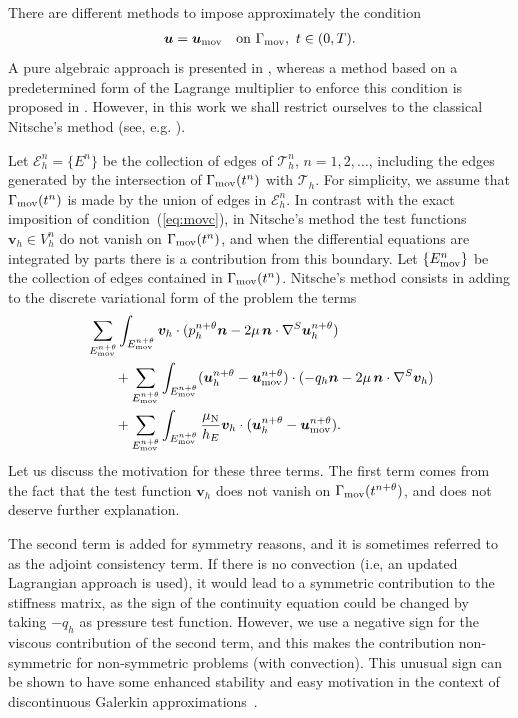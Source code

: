 \documentclass[11pt,a4paper,oneside,reqno]{amsart}
\newcommand{\Eq}[1]{(\ref{eq:#1})}
\def\u{{\bm u}}
\def\cl{\nonumber\\}
\def\nor{{\bm n}}
\def\vt{\bm v}
\begin{document}
There are different methods to impose approximately the condition 
\begin{align}
\u = \u_{\rm mov} \quad \hbox{on}~\Gamma_{\rm mov}, ~t \in (0,T).\label{eq:movc}
\end{align}
A pure algebraic approach is presented in \cite{codina-baiges-2014-1}, whereas a method based on a predetermined form of the Lagrange multiplier to enforce this condition is proposed in \cite{baiges-et-al-2012}. However, in this work we shall restrict ourselves to the classical Nitsche's method (see, e.g. \cite{juntunen-stenberg-09}). 

Let $\mathcal{E}_h^{n} = \{ E^n \}$ be the collection of edges of $\mathcal{T}_h^n$, $n = 1,2,\dots$, including the edges generated by the intersection of $\Gamma_{\rm mov} (t^n)$ with $\mathcal{T}_h$. For simplicity, we assume that $\Gamma_{\rm mov} (t^n)$ is made by the union of edges in $\mathcal{E}_h^{n}$. In contrast with the exact imposition of condition~\Eq{movc}, in Nitsche's method the test functions $\vt_h\in V_h^{n}$ do not vanish on $\Gamma_{\rm mov} (t^n)$, and when the differential equations are integrated by parts there is a contribution from this boundary. Let $\{ E^n_{\rm mov} \}$ be the collection of edges contained in $\Gamma_{\rm mov} (t^n)$. Nitsche's method consists in adding to the discrete variational form of the problem the terms
\begin{align}
& \sum_{E_{\rm mov}^{n+\theta}} \int_{E_{\rm mov}^{n+\theta}}
\vt_h \cdot (p_h^{n+\theta} \nor - 2 \mu \, \nor \cdot \nabla^S \u_h^{n+\theta})\cl
& \qquad + \sum_{E_{\rm mov}^{n+\theta}} \int_{E_{\rm mov}^{n+\theta}}
(\u_h^{n+\theta} - \u_{\rm mov}^{n+\theta}) \cdot (-q_h\nor - 2 \mu \, \nor \cdot \nabla^S \vt_h)\cl
& \qquad + \sum_{E_{\rm mov}^{n+\theta}} \int_{E_{\rm mov}^{n+\theta}}
\frac{\mu_{\rm N}}{h_E} \vt_h \cdot (\u_h^{n+\theta} - \u_{\rm mov}^{n+\theta}).\label{eq:nterms}
\end{align}
Let us discuss the motivation for these three terms. The first term comes from the fact that the test function $\vt_h$ does not vanish on $\Gamma_{\rm mov} (t^{n+\theta})$, and does not deserve further explanation.

The second term is added for symmetry reasons, and it is sometimes referred to as the adjoint consistency term. If there is no convection (i.e, an updated Lagrangian approach is used), it would lead to a symmetric contribution to the stiffness matrix, as the sign of the continuity equation could be changed by taking $-q_h$ as pressure test function. However, we use a negative sign for the viscous contribution of the second term, and this makes the contribution non-symmetric for non-symmetric problems (with convection). This unusual sign can be shown to have some enhanced stability and easy motivation in the context of discontinuous Galerkin approximations~\cite{CodinaBadia2013}. 
\end{document}
